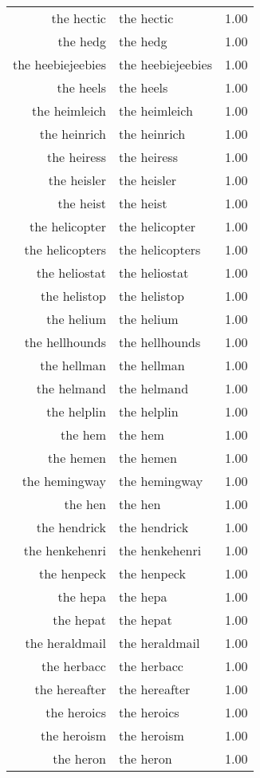 \begin{table}[ht]
\begin{tabular}{rlr}
  the hectic & the hectic & 1.00 \\ 
  the hedg & the hedg & 1.00 \\ 
  the heebiejeebies & the heebiejeebies & 1.00 \\ 
  the heels & the heels & 1.00 \\ 
  the heimleich & the heimleich & 1.00 \\ 
  the heinrich & the heinrich & 1.00 \\ 
  the heiress & the heiress & 1.00 \\ 
  the heisler & the heisler & 1.00 \\ 
  the heist & the heist & 1.00 \\ 
  the helicopter & the helicopter & 1.00 \\ 
  the helicopters & the helicopters & 1.00 \\ 
  the heliostat & the heliostat & 1.00 \\ 
  the helistop & the helistop & 1.00 \\ 
  the helium & the helium & 1.00 \\ 
  the hellhounds & the hellhounds & 1.00 \\ 
  the hellman & the hellman & 1.00 \\ 
  the helmand & the helmand & 1.00 \\ 
  the helplin & the helplin & 1.00 \\ 
  the hem & the hem & 1.00 \\ 
  the hemen & the hemen & 1.00 \\ 
  the hemingway & the hemingway & 1.00 \\ 
  the hen & the hen & 1.00 \\ 
  the hendrick & the hendrick & 1.00 \\ 
  the henkehenri & the henkehenri & 1.00 \\ 
  the henpeck & the henpeck & 1.00 \\ 
  the hepa & the hepa & 1.00 \\ 
  the hepat & the hepat & 1.00 \\ 
  the heraldmail & the heraldmail & 1.00 \\ 
  the herbacc & the herbacc & 1.00 \\ 
  the hereafter & the hereafter & 1.00 \\ 
  the heroics & the heroics & 1.00 \\ 
  the heroism & the heroism & 1.00 \\ 
  the heron & the heron & 1.00 \\ 

\end{tabular}
\end{table}
